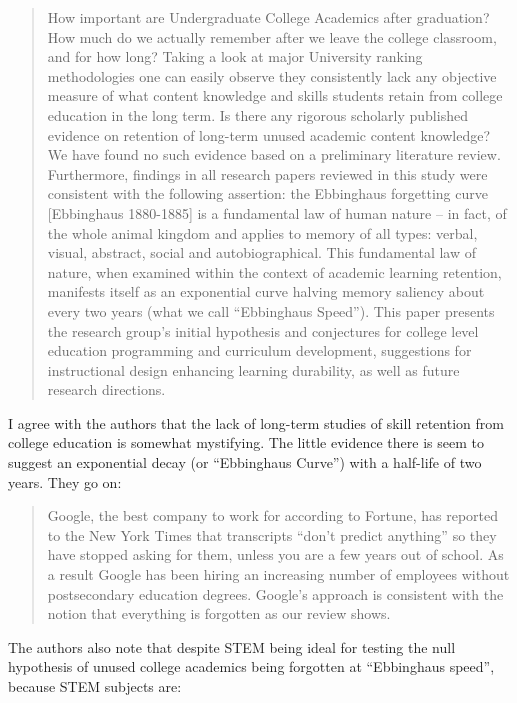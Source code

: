 \begin{quote}
How important are Undergraduate College Academics after graduation? How
much do we actually remember after we leave the college classroom, and
for how long? Taking a look at major University ranking methodologies
one can easily observe they consistently lack any objective measure of
what content knowledge and skills students retain from college education
in the long term. Is there any rigorous scholarly published evidence on
retention of long-term unused academic content knowledge? We have found
no such evidence based on a preliminary literature review. Furthermore,
findings in all research papers reviewed in this study were consistent
with the following assertion: the Ebbinghaus forgetting curve
{[}Ebbinghaus 1880-1885{]} is a fundamental law of human nature -- in
fact, of the whole animal kingdom and applies to memory of all types:
verbal, visual, abstract, social and autobiographical. This fundamental
law of nature, when examined within the context of academic learning
retention, manifests itself as an exponential curve halving memory
saliency about every two years (what we call ``Ebbinghaus Speed''). This
paper presents the research group's initial hypothesis and conjectures
for college level education programming and curriculum development,
suggestions for instructional design enhancing learning durability, as
well as future research directions.
\end{quote}

I agree with the authors that the lack of long-term studies of skill
retention from college education is somewhat mystifying. The little
evidence there is seem to suggest an exponential decay (or ``Ebbinghaus
Curve'') with a half-life of two years. They go on:

\begin{quote}
Google, the best company to work for according to Fortune, has reported
to the New York Times that transcripts ``don't predict anything'' so
they have stopped asking for them, unless you are a few years out of
school. As a result Google has been hiring an increasing number of
employees without postsecondary education degrees. Google's approach is
consistent with the notion that everything is forgotten as our review
shows.
\end{quote}

The authors also note that despite STEM being ideal for testing the null
hypothesis of unused college academics being forgotten at ``Ebbinghaus
speed'', because STEM subjects are:

